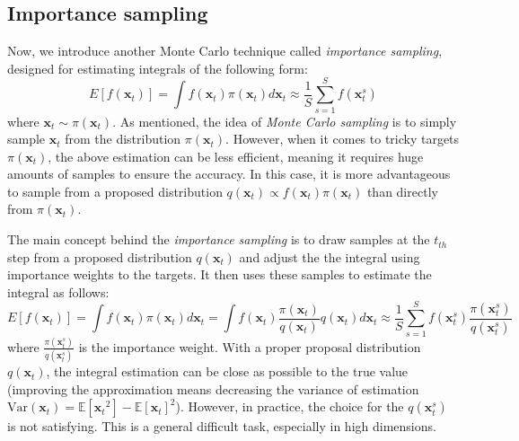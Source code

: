 \subsection{Importance sampling}
Now, we introduce another Monte Carlo technique called \textit{importance sampling}, designed for estimating integrals of the following form:
\begin{equation}
    \label{eq: MC_intergral}
    E[f(\boldsymbol{x}_{t})] = \int f(\boldsymbol{x}_{t})\pi(\boldsymbol{x}_{t}) d\boldsymbol{x}_{t}
    \approx \frac{1}{S}\sum_{s=1}^{S} f(\boldsymbol{x}_{t}^{s})
\end{equation}
where $\boldsymbol{x}_{t} \sim \pi(\boldsymbol{x}_{t})$. As mentioned, the idea of \textit{Monte Carlo sampling} is to simply sample $\boldsymbol{x}_{t}$ from the distribution $\pi(\boldsymbol{x}_{t})$. However, when it comes to tricky targets $\pi(\boldsymbol{x}_{t})$, the above estimation can be less efficient, meaning it requires huge amounts of samples to ensure the accuracy. In this case, it is more advantageous to sample from a proposed distribution $q(\boldsymbol{x}_{t}) \propto  f(\boldsymbol{x}_{t})\pi(\boldsymbol{x}_{t})$ than directly from $\pi(\boldsymbol{x}_{t})$.

The main concept behind the \textit{importance sampling} is to draw samples at the $t_{th}$ step from a proposed distribution $q(\boldsymbol{x}_{t})$ and adjust the the integral using importance weights to the targets. It then uses these samples to estimate the integral as follows:
\begin{equation}
    \label{eq: IS_integral}
    E[f(\boldsymbol{x}_{t})] = \int f(\boldsymbol{x}_{t})\pi(\boldsymbol{x}_{t}) d\boldsymbol{x}_{t} = \int f(\boldsymbol{x}_{t})\frac{\pi(\boldsymbol{x}_{t})}{q(\boldsymbol{x}_{t})}q(\boldsymbol{x}_{t}) d\boldsymbol{x}_{t}
    \approx \frac{1}{S} \sum_{s=1}^{S} f(\boldsymbol{x}_{t}^{s})\frac{\pi(\boldsymbol{x}_{t}^{s})}{q(\boldsymbol{x}_{t}^{s})}
\end{equation}
where $\frac{\pi(\boldsymbol{x}_{t}^{s})}{q(\boldsymbol{x}_{t}^{s})}$ is the importance weight. With a proper proposal distribution $q(\boldsymbol{x}_{t})$, the integral estimation can be close as possible to the true value (improving the approximation means decreasing the variance of estimation $\mathrm{Var}(\boldsymbol{x}_{t}) = \mathbb{E}[{\boldsymbol{x}_{t}}^2] - {\mathbb{E}[\boldsymbol{x}_{t}]}^2$). However, in practice, the choice for the $q(\boldsymbol{x}_{t}^{s})$ is not satisfying. This is a general difficult task, especially in high dimensions.







